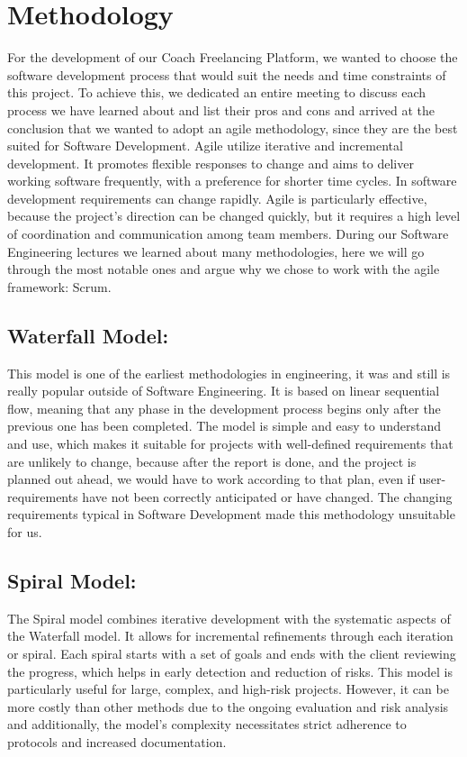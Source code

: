 \section{Methodology}
\label{sec:Methodology}

For the development of our Coach Freelancing Platform, we wanted to choose the software development process that would suit the needs and time constraints of this project. To achieve this, we dedicated an entire meeting to discuss each process we have learned about and list their pros and cons and arrived at the conclusion that we wanted to adopt an agile methodology, since they are the best suited for Software Development. Agile utilize iterative and incremental development. It promotes flexible responses to change and aims to deliver working software frequently, with a preference for shorter time cycles. In software development requirements can change rapidly. Agile is particularly effective, because the project's direction can be changed quickly, but it requires a high level of coordination and communication among team members.
During our Software Engineering lectures we learned about many methodologies, here we will go through the most notable ones and argue why we chose to work with the agile framework: Scrum.

\subsection{Waterfall Model:}
This model is one of the earliest methodologies in engineering, it was and still is really popular outside of Software Engineering. It is based on linear sequential flow, meaning that any phase in the development process begins only after the previous one has been completed. The model is simple and easy to understand and use, which makes it suitable for projects with well-defined requirements that are unlikely to change, because after the report is done, and the project is planned out ahead, we would have to work according to that plan, even if user-requirements have not been correctly anticipated or have changed. The changing requirements typical in Software Development made this methodology unsuitable for us.

\subsection{Spiral Model:}
The Spiral model combines iterative development with the systematic aspects of the Waterfall model. It allows for incremental refinements through each iteration or spiral. Each spiral starts with a set of goals and ends with the client reviewing the progress, which helps in early detection and reduction of risks. This model is particularly useful for large, complex, and high-risk projects. However, it can be more costly than other methods due to the ongoing evaluation and risk analysis and additionally, the model's complexity necessitates strict adherence to protocols and increased documentation.

